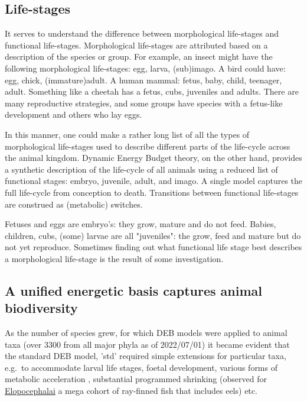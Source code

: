 
\subsection{Life-stages}

It serves to understand the difference between morphological life-stages and functional life-stages. Morphological life-stages are attributed based on a description of the species or group.
For example, an insect might have the following morphological life-stages: egg, larva, (sub)imago. 
A bird could have: egg, chick, (immature)adult. 
A human mammal: fetus, baby, child, teenager, adult. 
Something like a cheetah has a fetus, cubs, juveniles and adults. 
There are many reproductive strategies, and some groups have species with a fetus-like development and others who lay eggs. 

In this manner, one could make a rather long list of all the types of morphological life-stages used to describe different parts of the life-cycle across the animal kingdom.
Dynamic Energy Budget theory, on the other hand, provides a synthetic description of the life-cycle of all animals using a reduced list of functional stages: embryo, juvenile, adult, and imago.
A single model captures the full life-cycle from conception to death.
 Transitions between functional life-stages are construed as (metabolic) switches.

Fetuses and eggs are embryo's: they grow, mature and do not feed. 
Babies, children, cubs, (some) larvae are all "juveniles": the grow, feed and mature but do not yet reproduce.
Sometimes finding out what functional life stage best describes a morphological life-stage is the result of some investigation.

\subsection{A unified energetic basis captures animal biodiversity}

As the number of species grew, for which DEB models were applied to animal taxa (over 3300 from all major phyla as of 2022/07/01) it became evident that the standard DEB model, 'std' required simple extensions for particular taxa, e.g.\ to accommodate larval life stages, foetal development, various forms of metabolic acceleration \cite{Kooy2014}, substantial programmed shrinking (observed for \href{https://fishtreeoflife.org/taxonomy/megacohort/Elopocephalai/}{Elopocephalai} a mega cohort of ray-finned fish that includes eels)  etc.

